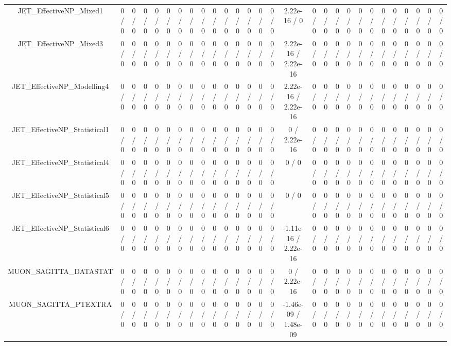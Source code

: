 \documentclass[10pt]{article}
\begin{document}
\begin{table}[htbp]
\begin{center}
\begin{tabular}{|c|c|c|c|c|c|c|c|c|c|c|c|c|c|c|c|c|c|c|c|c|c|c|c|c|c|c|c|}
  JET_EffectiveNP_Mixed1 & 0 / 0 & 0 / 0 & 0 / 0 & 0 / 0 & 0 / 0 & 0 / 0 & 0 / 0 & 0 / 0 & 0 / 0 & 0 / 0 & 0 / 0 & 0 / 0 & 0 / 0 & 0 / 0 & 2.22e-16 / 0 & 0 / 0 & 0 / 0 & 0 / 0 & 0 / 0 & 0 / 0 & 0 / 0 & 0 / 0 & 0 / 0 & 0 / 0 & 0 / 0 & 0 / 0 & 0 / 0 \\ 
  JET_EffectiveNP_Mixed3 & 0 / 0 & 0 / 0 & 0 / 0 & 0 / 0 & 0 / 0 & 0 / 0 & 0 / 0 & 0 / 0 & 0 / 0 & 0 / 0 & 0 / 0 & 0 / 0 & 0 / 0 & 0 / 0 & 2.22e-16 / 2.22e-16 & 0 / 0 & 0 / 0 & 0 / 0 & 0 / 0 & 0 / 0 & 0 / 0 & 0 / 0 & 0 / 0 & 0 / 0 & 0 / 0 & 0 / 0 & 0 / 0 \\ 
  JET_EffectiveNP_Modelling4 & 0 / 0 & 0 / 0 & 0 / 0 & 0 / 0 & 0 / 0 & 0 / 0 & 0 / 0 & 0 / 0 & 0 / 0 & 0 / 0 & 0 / 0 & 0 / 0 & 0 / 0 & 0 / 0 & 2.22e-16 / 2.22e-16 & 0 / 0 & 0 / 0 & 0 / 0 & 0 / 0 & 0 / 0 & 0 / 0 & 0 / 0 & 0 / 0 & 0 / 0 & 0 / 0 & 0 / 0 & 0 / 0 \\ 
  JET_EffectiveNP_Statistical1 & 0 / 0 & 0 / 0 & 0 / 0 & 0 / 0 & 0 / 0 & 0 / 0 & 0 / 0 & 0 / 0 & 0 / 0 & 0 / 0 & 0 / 0 & 0 / 0 & 0 / 0 & 0 / 0 & 0 / 2.22e-16 & 0 / 0 & 0 / 0 & 0 / 0 & 0 / 0 & 0 / 0 & 0 / 0 & 0 / 0 & 0 / 0 & 0 / 0 & 0 / 0 & 0 / 0 & 0 / 0 \\ 
  JET_EffectiveNP_Statistical4 & 0 / 0 & 0 / 0 & 0 / 0 & 0 / 0 & 0 / 0 & 0 / 0 & 0 / 0 & 0 / 0 & 0 / 0 & 0 / 0 & 0 / 0 & 0 / 0 & 0 / 0 & 0 / 0 & 0 / 0 & 0 / 0 & 0 / 0 & 0 / 0 & 0 / 0 & 0 / 0 & 0 / 0 & 0 / 0 & 0 / 0 & 0 / 0 & 0 / 0 & 0 / 0 & 0 / 0 \\ 
  JET_EffectiveNP_Statistical5 & 0 / 0 & 0 / 0 & 0 / 0 & 0 / 0 & 0 / 0 & 0 / 0 & 0 / 0 & 0 / 0 & 0 / 0 & 0 / 0 & 0 / 0 & 0 / 0 & 0 / 0 & 0 / 0 & 0 / 0 & 0 / 0 & 0 / 0 & 0 / 0 & 0 / 0 & 0 / 0 & 0 / 0 & 0 / 0 & 0 / 0 & 0 / 0 & 0 / 0 & 0 / 0 & 0 / 0 \\ 
  JET_EffectiveNP_Statistical6 & 0 / 0 & 0 / 0 & 0 / 0 & 0 / 0 & 0 / 0 & 0 / 0 & 0 / 0 & 0 / 0 & 0 / 0 & 0 / 0 & 0 / 0 & 0 / 0 & 0 / 0 & 0 / 0 & -1.11e-16 / 2.22e-16 & 0 / 0 & 0 / 0 & 0 / 0 & 0 / 0 & 0 / 0 & 0 / 0 & 0 / 0 & 0 / 0 & 0 / 0 & 0 / 0 & 0 / 0 & 0 / 0 \\ 
  MUON_SAGITTA_DATASTAT & 0 / 0 & 0 / 0 & 0 / 0 & 0 / 0 & 0 / 0 & 0 / 0 & 0 / 0 & 0 / 0 & 0 / 0 & 0 / 0 & 0 / 0 & 0 / 0 & 0 / 0 & 0 / 0 & 0 / 2.22e-16 & 0 / 0 & 0 / 0 & 0 / 0 & 0 / 0 & 0 / 0 & 0 / 0 & 0 / 0 & 0 / 0 & 0 / 0 & 0 / 0 & 0 / 0 & 0 / 0 \\ 
  MUON_SAGITTA_PTEXTRA & 0 / 0 & 0 / 0 & 0 / 0 & 0 / 0 & 0 / 0 & 0 / 0 & 0 / 0 & 0 / 0 & 0 / 0 & 0 / 0 & 0 / 0 & 0 / 0 & 0 / 0 & 0 / 0 & -1.46e-09 / 1.48e-09 & 0 / 0 & 0 / 0 & 0 / 0 & 0 / 0 & 0 / 0 & 0 / 0 & 0 / 0 & 0 / 0 & 0 / 0 & 0 / 0 & 0 / 0 & 0 / 0 \\ 

\end{tabular}
\end{center}
\end{table}
\end{document}
